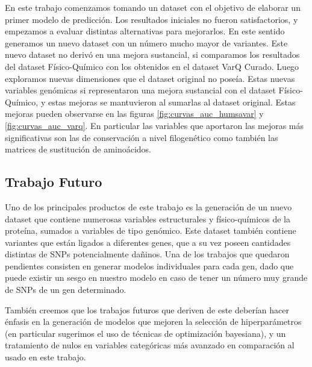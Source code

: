 En este trabajo comenzamos tomando un dataset con el objetivo de elaborar un primer modelo de predicción. Los resultados iniciales no fueron satisfactorios, y empezamos a evaluar distintas alternativas para mejorarlos. En este sentido generamos un nuevo dataset con un número mucho mayor de variantes. Este nuevo dataset no derivó en una mejora sustancial, si comparamos los resultados del dataset Físico-Químico con los obtenidos en el dataset VarQ Curado. Luego exploramos nuevas dimensiones que el dataset original no poseía. Estas nuevas variables genómicas si representaron una mejora sustancial con el dataset Físico-Químico, y estas mejoras se mantuvieron al sumarlas al dataset original. Estas mejoras pueden observarse en las figuras \ref{fig:curvas_auc_humsavar} y \ref{fig:curvas_auc_varq}. En particular las variables que aportaron las mejoras más significativas son las de conservación a nivel filogenético como también las matrices de sustitución de aminoácidos.

\subsection{Trabajo Futuro}

Uno de los principales productos de este trabajo es la generación de un nuevo dataset que contiene numerosas variables estructurales y físico-químicos de la proteína, sumados a variables de tipo genómico. Este dataset también contiene variantes que están ligados a diferentes genes, que a su vez poseen cantidades distintas de SNPs potencialmente dañinos. Una de los trabajos que quedaron pendientes consisten en generar modelos individuales para cada gen, dado que puede existir un sesgo en nuestro modelo en caso de tener un número muy grande de SNPs de un gen determinado.

También creemos que los trabajos futuros que deriven de este deberían hacer énfasis en la generación de modelos que mejoren la selección de hiperparámetros (en particular sugerimos el uso de técnicas de optimización bayesiana), y un tratamiento de nulos en variables categóricas más avanzado en comparación al usado en este trabajo. 


\newpage



